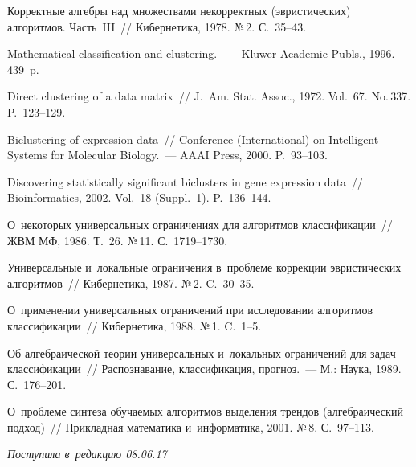 \begin{multicols}{2}
{{\begin{thebibliography}{99}
 Корректные алгебры над множествами 
некорректных (эвристических) алгоритмов.  Часть~III~// Кибернетика, 1978. №\,2. 
С.~35--43.

 Mathematical classification and clustering. ~--- 
Kluwer Academic Publs., 1996. 439~p.


 Direct clustering of a data matrix~// 
J.~Am. Stat. Assoc., 1972. Vol.~67. No.\,337. P.~123--129.

Biclustering of expression data~//  Conference
(International) on Intelligent Systems for 
Molecular Biology.~--- AAAI Press, 2000. P.~93--103.

 Discovering 
statistically significant biclusters in gene expression data~// Bioinformatics, 
2002. Vol.~18 (Suppl.~1). P.~136--144.



 О~некоторых универсальных 
ограничениях для алгоритмов классификации~// ЖВМ МФ, 1986. Т.~26. №\,11. 
С.~1719--1730.

Универсальные и~локальные ограничения в~проблеме коррекции эвристических 
алгоритмов~// Кибернетика, 1987. №\,2. C.~30--35.

 О~применении универсальных 
ограничений при
исследовании алгоритмов классификации~// Кибернетика, 1988. №\,1. C.~1--5.

 Об алгебраической теории универсальных 
и~локальных ограничений для задач классификации~// Распознавание, классификация, 
прогноз.~--- М.: Наука, 1989. С.~176--201.

 О~проблеме синтеза 
обуча\-емых алгоритмов выделения трендов (алгебраический подход)~// Прикладная 
математика и~информатика, 2001. №\,8. С.~97--113.

 \end{thebibliography}

 }
 }

\end{multicols}


\hfill{\small\textit{Поступила в~редакцию 08.06.17}}

\vspace*{10pt}

